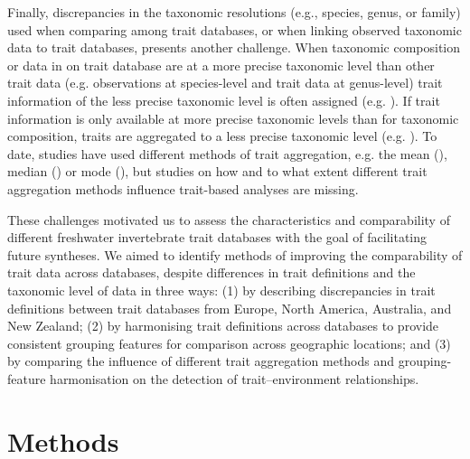 \documentclass[12pt]{article}
\begin{document}
Finally, discrepancies in the taxonomic resolutions (e.g., species, genus, or family) used when comparing among trait databases, or when linking observed taxonomic data to trait databases, presents another challenge. When taxonomic composition or data in on trait database are at a more precise taxonomic level than other trait data (e.g. observations at species-level and trait data at genus-level) trait information of the less precise taxonomic level is often assigned (e.g. \cite{szocs_effects_2014, vos_taxonomic_2017}). If trait information is only available at more precise taxonomic levels than for taxonomic composition, traits are aggregated to a less precise taxonomic level (e.g. \cite{aspin_extreme_2019, piliere_a._f._h._importance_2016, poff_functional_2006, szocs_effects_2014}). To date, studies have used different methods of trait aggregation, e.g. the mean (\cite{magliozzi_functional_2019}), median (\cite{szocs_effects_2014}) or mode (\cite{piliere_a._f._h._importance_2016}), but studies on how and to what extent different trait aggregation methods influence trait-based analyses are missing. 

These challenges motivated us to assess the characteristics and comparability of different freshwater invertebrate trait databases with the goal of facilitating future syntheses. We aimed to identify methods of improving the comparability of trait data across databases, despite differences in trait definitions and the taxonomic level of data in three ways: (1) by describing discrepancies in trait definitions between trait databases from Europe, North America, Australia, and New Zealand; (2) by harmonising trait definitions across databases to provide consistent grouping features for comparison across geographic locations; and (3) by comparing the influence of different trait aggregation methods and grouping-feature harmonisation on the detection of trait–environment relationships.


\section*{Methods}
\end{document}
